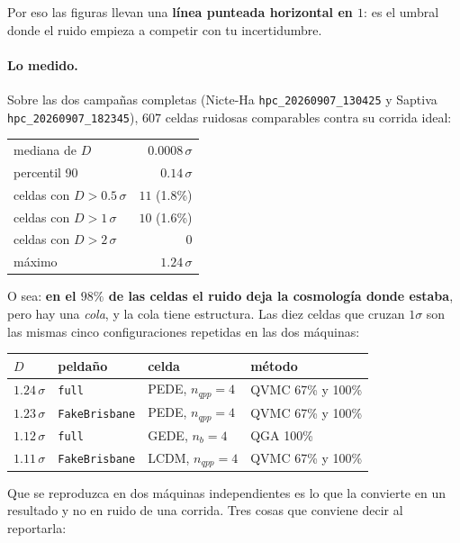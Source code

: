 \documentclass[11pt,a4paper]{article}
\begin{document}
\noindent
Por eso las figuras llevan una \textbf{línea punteada horizontal en $1$}: es
el umbral donde el ruido empieza a competir con tu incertidumbre.

\paragraph{Lo medido.} Sobre las dos campañas completas (Nicte-Ha
\texttt{hpc\_20260907\_130425} y Saptiva \texttt{hpc\_20260907\_182345}),
$607$ celdas ruidosas comparables contra su corrida ideal:

\begin{center}
\small
\begin{tabular}{lr}
\toprule
mediana de $D$              & $0.0008\,\sigma$ \\
percentil 90                & $0.14\,\sigma$ \\
celdas con $D > 0.5\,\sigma$ & $11$ \;(1.8\%) \\
celdas con $D > 1\,\sigma$   & $10$ \;(1.6\%) \\
celdas con $D > 2\,\sigma$   & $0$ \\
máximo                      & $1.24\,\sigma$ \\
\bottomrule
\end{tabular}
\end{center}

\noindent
O sea: \textbf{en el $98\%$ de las celdas el ruido deja la cosmología donde
estaba}, pero hay una \emph{cola}, y la cola tiene estructura. Las diez
celdas que cruzan $1\sigma$ son las mismas cinco configuraciones repetidas en
las dos máquinas:

\begin{center}
\small
\begin{tabular}{llll}
\toprule
$D$ & peldaño & celda & método \\
\midrule
$1.24\,\sigma$ & \texttt{full}         & PEDE, $n_{qpp}=4$ & QVMC 67\% y 100\% \\
$1.23\,\sigma$ & \texttt{FakeBrisbane} & PEDE, $n_{qpp}=4$ & QVMC 67\% y 100\% \\
$1.12\,\sigma$ & \texttt{full}         & GEDE, $n_b=4$     & QGA 100\% \\
$1.11\,\sigma$ & \texttt{FakeBrisbane} & LCDM, $n_{qpp}=4$ & QVMC 67\% y 100\% \\
\bottomrule
\end{tabular}
\end{center}

\noindent
Que se reproduzca en dos máquinas independientes es lo que la convierte en un
resultado y no en ruido de una corrida. Tres cosas que conviene decir al
reportarla:
\end{document}
